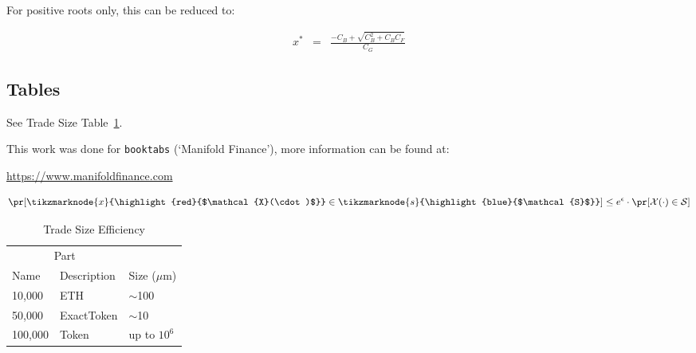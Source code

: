 \documentclass{article}
\begin{document}
For positive roots only, this can be reduced to:

\begin{eqnarray}
	x^* &=& \frac{- C_{B} + \sqrt{C_{B} ^2 + C_{B} C_{F}}}{C_{G}} \label{eqn:sol2}
\end{eqnarray}


\subsection{Tables}
See Trade Size Table~\ref{tab:table}.

This work was done for \verb+booktabs+ (`Manifold Finance'), more information can be found at:
\begin{center}
	\url{https://www.manifoldfinance.com}
\end{center}


\begin{equation}
	\vspace{\baselineskip}
	\label{eq:epsilon}
	\pr[\tikzmarknode{x}{\highlight{red}{$\mathcal{X}(\cdot)$}}\in \tikzmarknode{s}{\highlight{blue}{$\mathcal{S}$}}] \leq e^\epsilon \cdot \pr[\mathcal{X}(\cdot)\in \mathcal{S}]
\end{equation}



\begin{table}
	\caption{Trade Size Efficiency}
	\centering
	\begin{tabular}{lll}
		\toprule
		\multicolumn{2}{c}{Part}              \\
		\cmidrule(r){1-2}
		Name    & Description & Size ($\mu$m) \\
		\midrule
		10,000  & ETH         & $\sim$100     \\
		50,000  & ExactToken  & $\sim$10      \\
		100,000 & Token       & up to $10^6$  \\
		\bottomrule
	\end{tabular}
	\label{tab:table}
\end{table}
\end{document}
